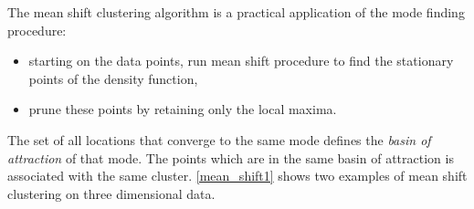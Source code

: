 The mean shift clustering algorithm is a practical application of the mode
finding procedure:
\begin{itemize}
	\item starting on the data points, run mean shift procedure to find the 
	stationary points of the density function,
	\item prune these points by retaining only the local maxima.
\end{itemize}

The set of all locations that converge to the same mode defines the \emph{basin of attraction} of that mode. The points which are in the same basin of 
attraction is associated with the same cluster. \autoref{mean_shift1} shows two examples of mean shift clustering on three dimensional data.





